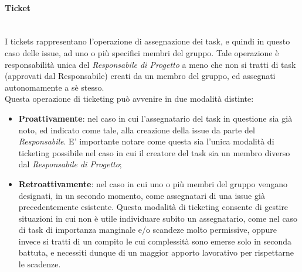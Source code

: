 \paragraph{Ticket} ~\\
I tickets rappresentano l'operazione di assegnazione dei task, e quindi in questo caso delle issue, ad uno o più specifici membri del gruppo. Tale operazione è responsabilità unica del \textit{Responsabile di Progetto} a meno che non si tratti di task (approvati dal Responsabile) creati da un membro del gruppo, ed assegnati autonomamente a sè stesso.\\
Questa operazione di ticketing può avvenire in due modalità distinte:
\begin{itemize}
	\item \textbf{Proattivamente}: nel caso in cui l'assegnatario del task in questione sia già noto, ed indicato come tale, alla creazione della issue da parte del \textit{Responsabile}. E' importante notare come questa sia l'unica modalità di ticketing possibile nel caso in cui il creatore del task sia un membro diverso dal \textit{Responsabile di Progetto};
	\item \textbf{Retroattivamente}: nel caso in cui uno o più membri del gruppo vengano designati, in un secondo momento, come assegnatari di una issue già precedentemente esistente. Questa modalità di ticketing consente di gestire situazioni in cui non è utile individuare subito un assegnatario, come nel caso di task di importanza manginale e/o scandeze molto permissive, oppure invece si tratti di un compito le cui complessità sono emerse solo in seconda battuta, e necessiti dunque di un maggior apporto lavorativo per rispettarne le scadenze.
\end{itemize}
